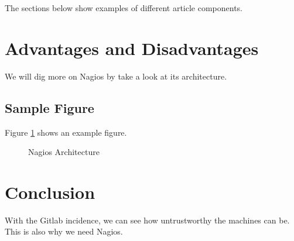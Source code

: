 \documentclass[9pt,twocolumn,twoside]{styles/osajnl}
\begin{document}
\label{sec:examples}

The sections below show examples of different article components.

\section{Advantages and Disadvantages}

We will dig more on Nagios by take a look at its architecture.

\subsection{Sample Figure}

Figure \ref{fig:nagios-architecture} shows an example figure.

\begin{figure}[htbp]
\centering
{}
\caption{Nagios Architecture}
\label{fig:nagios-architecture}
\end{figure}



\section{Conclusion}


With the Gitlab incidence, we can see how untrustworthy the machines can be. This is also why we need Nagios.
\end{document}
